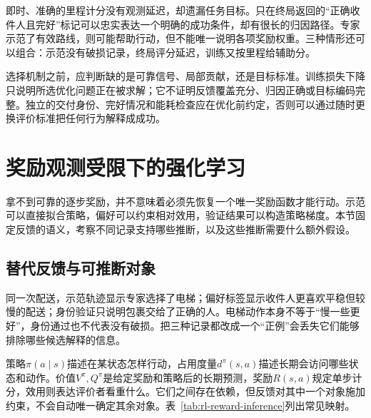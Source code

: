 即时、准确的里程计分没有观测延迟，却遗漏任务目标。只在终局返回的“正确收件人且完好”标记可以忠实表达一个明确的成功条件，却有很长的归因路径。专家示范了有效路线，则可能帮助行动，但不能唯一说明各项奖励权重。三种情形还可以组合：示范没有破损记录，终局评分延迟，训练又按里程给辅助分。

选择机制之前，应判断缺的是可靠信号、局部贡献，还是目标标准。训练损失下降只说明所选优化问题正在被求解；它不证明反馈覆盖充分、归因正确或目标编码完整。独立的交付身份、完好情况和能耗检查应在优化前约定，否则可以通过随时更换评价标准把任何行为解释成成功。

\section{奖励观测受限下的强化学习}
\label{sec:rl-reward-alternative}

拿不到可靠的逐步奖励，并不意味着必须先恢复一个唯一奖励函数才能行动。示范可以直接拟合策略，偏好可以约束相对效用，验证结果可以构造策略梯度。本节固定反馈的语义，考察不同记录支持哪些推断，以及这些推断需要什么额外假设。

\subsection{替代反馈与可推断对象}
\label{sec:rl-reward-inference}

同一次配送，示范轨迹显示专家选择了电梯；偏好标签显示收件人更喜欢平稳但较慢的配送；身份验证只说明包裹交给了正确的人。电梯动作本身不等于“慢一些更好”，身份通过也不代表没有破损。把三种记录都改成一个“正例”会丢失它们能够排除哪些候选解释的信息。

策略$\pi(a\mid s)$描述在某状态怎样行动，占用度量$d^\pi(s,a)$描述长期会访问哪些状态和动作。价值$V^\pi,Q^\pi$是给定奖励和策略后的长期预测，奖励$R(s,a)$规定单步计分，效用则表达评价者看重什么。它们之间存在依赖，但反馈对其中一个对象施加约束，不会自动唯一确定其余对象。表~\ref{tab:rl-reward-inference}列出常见映射。

